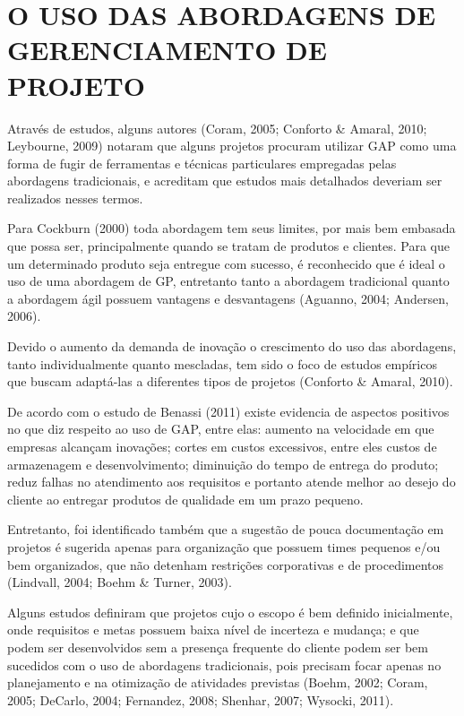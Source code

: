 \section{O USO DAS ABORDAGENS DE GERENCIAMENTO DE PROJETO}

Através de estudos, alguns autores (Coram, 2005; Conforto \& Amaral, 2010; Leybourne, 2009) notaram que alguns projetos procuram utilizar GAP como uma forma de fugir de ferramentas e técnicas particulares empregadas pelas abordagens tradicionais, e acreditam que estudos mais detalhados deveriam ser realizados nesses termos.

Para Cockburn (2000) toda abordagem tem seus limites, por mais bem embasada que possa ser, principalmente quando se tratam de produtos e clientes. Para que um determinado produto seja entregue com sucesso, é reconhecido que é ideal o uso de uma abordagem de GP, entretanto tanto a abordagem tradicional quanto a abordagem ágil possuem vantagens e desvantagens (Aguanno, 2004; Andersen, 2006).

Devido o aumento da demanda de inovação o crescimento do uso das abordagens, tanto individualmente quanto mescladas, tem sido o foco de estudos empíricos que buscam adaptá-las a diferentes tipos de projetos (Conforto \& Amaral, 2010).

De acordo com o estudo de Benassi (2011) existe evidencia de aspectos positivos no que diz respeito ao uso de GAP, entre elas: aumento na velocidade em que empresas alcançam inovações; cortes em custos excessivos, entre eles custos de armazenagem e desenvolvimento; diminuição do tempo de entrega do produto; reduz falhas no atendimento aos requisitos e portanto atende melhor ao desejo do cliente ao entregar produtos de qualidade em um prazo pequeno.

Entretanto, foi identificado também que a sugestão de pouca documentação em projetos é sugerida apenas para organização que possuem times pequenos e/ou bem organizados, que não detenham restrições corporativas e de procedimentos (Lindvall, 2004; Boehm \& Turner, 2003).

Alguns estudos definiram que projetos cujo o escopo é bem definido inicialmente, onde requisitos e metas possuem baixa nível de incerteza e mudança; e que podem ser desenvolvidos sem a presença frequente do cliente podem ser bem sucedidos com o uso de abordagens tradicionais, pois precisam focar apenas no planejamento e na otimização de atividades previstas (Boehm, 2002; Coram, 2005; DeCarlo, 2004; Fernandez, 2008; Shenhar, 2007; Wysocki, 2011).

